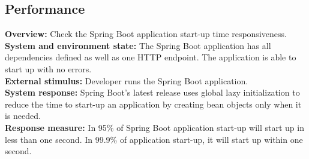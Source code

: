 \subsection*{Performance}

\textbf{Overview:} Check the Spring Boot application start-up time responsiveness.\\

\textbf{System and environment state:} The Spring Boot application has all dependencies defined as well as one HTTP endpoint. The application is able to start up with no errors.\\

\textbf{External stimulus:} Developer runs the Spring Boot application.\\

\textbf{System response:} Spring Boot's latest release uses global lazy initialization to reduce the time to start-up an application by creating bean objects only when it is needed.\\

\textbf{Response measure:} In 95\% of Spring Boot application start-up will start up in less than one second. In 99.9\% of application start-up, it will start up within one second.
